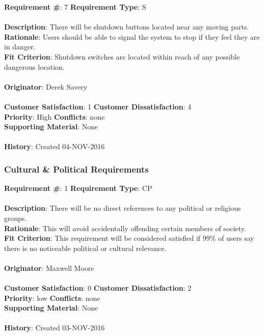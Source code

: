 \documentclass[titlepage]{article}
\begin{document}
\begin{framed}
	\noindent\textbf{Requirement \#}: 7 \hfill \textbf{Requirement Type}: S \hfill\\\\
	\noindent\textbf{Description}: There will be shutdown buttons located near any moving parts.\\
	\textbf{Rationale}: Users should be able to signal the system to stop if they feel they are in danger.\\
	\textbf{Fit Criterion}: Shutdown switches are located within reach of any possible dangerous location.\\\\
	\textbf{Originator}: Derek Savery\\\\
	\noindent\textbf{Customer Satisfaction}: 1 \hfill 	\textbf{Customer Dissatisfaction}: 4 \hfill\\
	\textbf{Priority}: High \hfill \textbf{Conflicts}: none \hfill\\
	\textbf{Supporting Material}: None\\\\
	\noindent\textbf{History}: Created 04-NOV-2016
\end{framed}

\subsubsection{Cultural \& Political Requirements}
\begin{framed}
	\noindent\textbf{Requirement \#}: 1 \hfill \textbf{Requirement Type}: CP \hfill\\\\
	\noindent\textbf{Description}: There will be no direct references to any political or religious groups.\\
	\textbf{Rationale}: This will avoid accidentally offending certain members of society.\\
	\textbf{Fit Criterion}: This requirement will be considered satisfied if 99\% of users say there is no noticeable political or cultural relevance.\\\\
	\textbf{Originator}: Maxwell Moore\\\\
	\noindent\textbf{Customer Satisfaction}: 0 \hfill 	\textbf{Customer Dissatisfaction}: 2 \hfill\\
	\textbf{Priority}: low \hfill \textbf{Conflicts}: none \hfill\\
	\textbf{Supporting Material}: None\\\\
	\noindent\textbf{History}: Created 03-NOV-2016
\end{framed}
\end{document}
